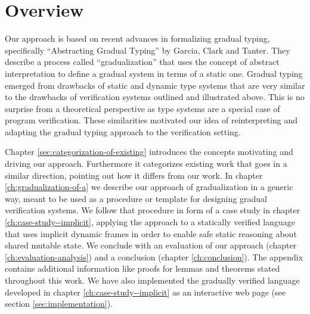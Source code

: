 

\section{Overview}
Our approach is based on recent advances in formalizing gradual typing, specifically “Abstracting Gradual Typing” \cite{garcia2016abstracting} by Garcia, Clark and Tanter.
They describe a process called “gradualization” that uses the concept of abstract interpretation to define a gradual system in terms of a static one.
Gradual typing emerged from drawbacks of static and dynamic type systems that are very similar to the drawbacks of verification systems outlined and illustrated above.
This is no surprise from a theoretical perspective as type systems are a special case of program verification. 
These similarities motivated our idea of reinterpreting and adapting the gradual typing approach to the verification setting.

Chapter \ref{sec:categorization-of-existing} introduces the concepts motivating and driving our approach.
Furthermore it categorizes existing work that goes in a similar direction, pointing out how it differs from our work.
In chapter \ref{ch:gradualization-of-a} we describe our approach of gradualization in a generic way, meant to be used as a procedure or template for designing gradual verification systems.
We follow that procedure in form of a case study in chapter \ref{ch:case-study--implicit}, applying the approach to a statically verified language that uses implicit dynamic frames in order to enable safe static reasoning about shared mutable state.
We conclude with an evaluation of our approach (chapter \ref{ch:evaluation-analysis}) and a conclusion (chapter \ref{ch:conclusion}).
The appendix contains additional information like proofs for lemmas and theorems stated throughout this work. %
We have also implemented the gradually verified language developed in chapter \ref{ch:case-study--implicit} as an interactive web page (see section \ref{sec:implementation}).
